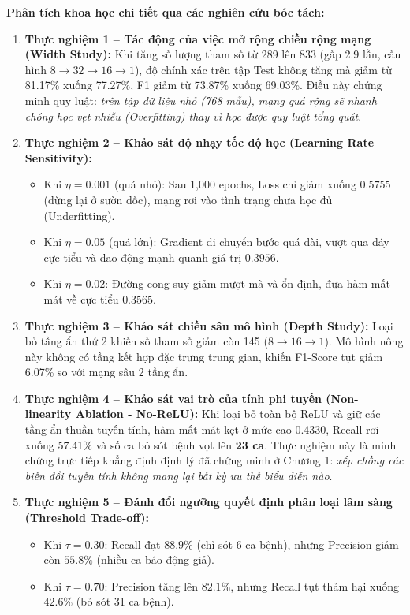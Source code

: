 \documentclass[12pt,a4paper]{report}
\begin{document}
\textbf{Phân tích khoa học chi tiết qua các nghiên cứu bóc tách:}
\begin{enumerate}
    \item \textbf{Thực nghiệm 1 -- Tác động của việc mở rộng chiều rộng mạng (Width Study):} Khi tăng số lượng tham số từ 289 lên 833 (gấp 2.9 lần, cấu hình $8 \to 32 \to 16 \to 1$), độ chính xác trên tập Test không tăng mà giảm từ 81.17\% xuống 77.27\%, F1 giảm từ 73.87\% xuống 69.03\%. Điều này chứng minh quy luật: \textit{trên tập dữ liệu nhỏ (768 mẫu), mạng quá rộng sẽ nhanh chóng học vẹt nhiễu (Overfitting) thay vì học được quy luật tổng quát}.
    \item \textbf{Thực nghiệm 2 -- Khảo sát độ nhạy tốc độ học (Learning Rate Sensitivity):}
    \begin{itemize}
        \item Khi $\eta = 0.001$ (quá nhỏ): Sau 1,000 epochs, Loss chỉ giảm xuống $0.5755$ (dừng lại ở sườn dốc), mạng rơi vào tình trạng chưa học đủ (Underfitting).
        \item Khi $\eta = 0.05$ (quá lớn): Gradient di chuyển bước quá dài, vượt qua đáy cực tiểu và dao động mạnh quanh giá trị $0.3956$.
        \item Khi $\eta = 0.02$: Đường cong suy giảm mượt mà và ổn định, đưa hàm mất mát về cực tiểu $0.3565$.
    \end{itemize}
    \item \textbf{Thực nghiệm 3 -- Khảo sát chiều sâu mô hình (Depth Study):} Loại bỏ tầng ẩn thứ 2 khiến số tham số giảm còn 145 ($8 \to 16 \to 1$). Mô hình nông này không có tầng kết hợp đặc trưng trung gian, khiến F1-Score tụt giảm 6.07\% so với mạng sâu 2 tầng ẩn.
    \item \textbf{Thực nghiệm 4 -- Khảo sát vai trò của tính phi tuyến (Non-linearity Ablation - No-ReLU):} Khi loại bỏ toàn bộ ReLU và giữ các tầng ẩn thuần tuyến tính, hàm mất mát kẹt ở mức cao $0.4330$, Recall rơi xuống 57.41\% và số ca bỏ sót bệnh vọt lên \textbf{23 ca}. Thực nghiệm này là minh chứng trực tiếp khẳng định định lý đã chứng minh ở Chương 1: \textit{xếp chồng các biến đổi tuyến tính không mang lại bất kỳ ưu thế biểu diễn nào}.
    \item \textbf{Thực nghiệm 5 -- Đánh đổi ngưỡng quyết định phân loại lâm sàng (Threshold Trade-off):}
    \begin{itemize}
        \item Khi $\tau = 0.30$: Recall đạt $88.9\%$ (chỉ sót 6 ca bệnh), nhưng Precision giảm còn $55.8\%$ (nhiều ca báo động giả).
        \item Khi $\tau = 0.70$: Precision tăng lên $82.1\%$, nhưng Recall tụt thảm hại xuống $42.6\%$ (bỏ sót 31 ca bệnh).

\end{itemize}
\end{enumerate}
\end{document}
